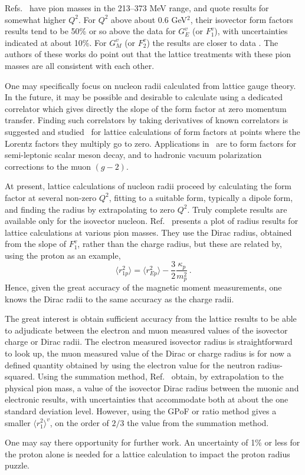 Refs.~\cite{Alexandrou:2013joa,Bhattacharya:2013ehc} have pion masses in the 213--373 MeV range, and quote results for somewhat higher $Q^2$.  For $Q^2$ above about $0.6$ GeV$^2$, their isovector form factors results tend to be 50\% or so above the data for $G_E^v$ (or $F_1^v$), with uncertainties indicated at about 10\%.  For $G_M^v$ (or $F_2^v$) the results are closer to data .  The authors of these works do point out that the lattice treatments with these pion masses are all consistent with each other.

One may specifically focus on nucleon radii calculated from lattice gauge theory.  In the future, it may be possible and desirable to calculate using a dedicated correlator which gives directly the slope of the form factor at zero momentum transfer.  Finding such correlators by taking derivatives of known correlators is suggested and studied~\cite{deDivitiis:2012vs} for lattice calculations of form factors at points where the Lorentz factors they multiply go to zero.  Applications in~\cite{deDivitiis:2012vs} are to form factors for semi-leptonic scalar meson decay, and to hadronic vacuum polarization corrections to the muon $(g-2)$.

At present, lattice calculations of nucleon radii proceed by calculating the form factor at several non-zero $Q^2$, fitting to a suitable form, typically a dipole form, and finding the radius by extrapolating to zero $Q^2$.  Truly complete results are available only for the isovector nucleon.  Ref.~\cite{Green:2014xba} presents a plot of radius results for lattice calculations at various pion masses.  They use the Dirac radius, obtained from the slope of $F_1^v$, rather than the charge radius, but these are related by, using the proton as an example,
\begin{equation}
\langle r_{1p}^2 \rangle = \langle r_{Ep}^2 \rangle - \frac{3}{2} \frac{\kappa_p}{m_p^2}	\,.
\end{equation}
Hence, given the great accuracy of the magnetic moment measurements, one knows the Dirac radii to the same accuracy as the charge radii.  

The great interest is obtain sufficient accuracy from the lattice results to be able to adjudicate between the electron and muon measured values of the isovector charge or Dirac radii.  The electron measured isovector radius is straightforward to look up, the muon measured value of the Dirac or charge radius is for now a defined quantity obtained by using the electron value for the neutron radius-squared.  Using the summation method, Ref.~\cite{Green:2014xba} obtain, by extrapolation to the physical pion mass, a value of the isovector Dirac radius between the muonic and electronic results, with uncertainties that accommodate both at about the one standard deviation level.  However, using the GPoF or ratio method gives a smaller $\langle r_{1}^2 \rangle^v$, on the order of $2/3$ the value from the summation method.

One may say there opportunity for further work.  An uncertainty of 1\% or less for the proton alone is needed for a lattice calculation to impact the proton radius puzzle.





